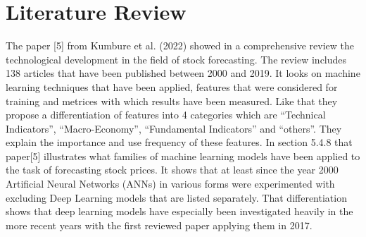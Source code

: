 \documentclass[a4paper,12pt]{report}
\begin{document}
\chapter{Literature Review}
The paper [5] from Kumbure et al. (2022) showed in a comprehensive review the technological development in the field of stock forecasting. The review includes 138 articles that have been published between 2000 and 2019. It looks on machine learning techniques that have been applied, features that were considered for training and metrices with which results have been measured. Like that they propose a differentiation of features into 4 categories which are “Technical Indicators”, “Macro-Economy”, “Fundamental Indicators” and “others”. They explain the importance and use frequency of these features. In section 5.4.8 that paper[5] illustrates what families of machine learning models have been applied to the task of forecasting stock prices. It shows that at least since the year 2000 Artificial Neural Networks (ANNs) in various forms were experimented with excluding Deep Learning models that are listed separately. That differentiation shows that deep learning models have especially been investigated heavily in the more recent years with the first reviewed paper applying them in 2017. \\[0,2cm]
\end{document}
